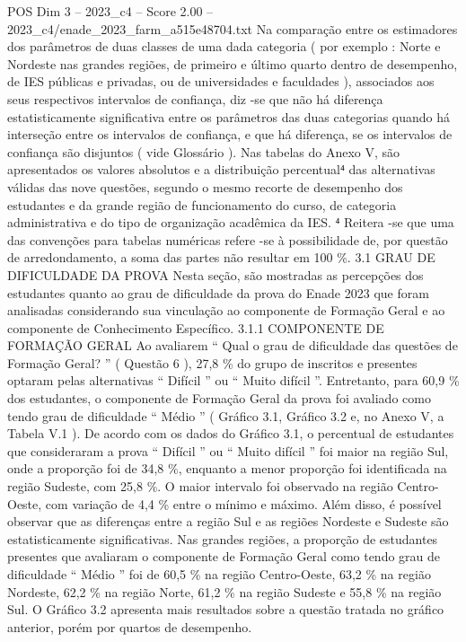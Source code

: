 \begin{textsample}{POS Dim 3 – 2023\_c4 – Score 2.00 – 2023\_c4/enade\_2023\_farm\_a515e48704.txt}
Na comparação entre os estimadores dos parâmetros de duas classes de uma dada categoria ( por exemplo : Norte e Nordeste nas grandes regiões, de primeiro e último quarto dentro de desempenho, de IES públicas e privadas, ou de universidades e faculdades ), associados aos seus respectivos intervalos de confiança, diz -se que não há diferença estatisticamente significativa entre os parâmetros das duas categorias quando há interseção entre os intervalos de confiança, e que há diferença, se os intervalos de confiança são disjuntos ( vide Glossário ).
Nas tabelas do Anexo V, são apresentados os valores absolutos e a distribuição percentual⁴ das alternativas válidas das nove questões, segundo o mesmo recorte de desempenho dos estudantes e da grande região de funcionamento do curso, de categoria administrativa e do tipo de organização acadêmica da IES. ⁴ Reitera -se que uma das convenções para tabelas numéricas refere -se à possibilidade de, por questão de arredondamento, a soma das partes não resultar em 100 \%. 3.1 GRAU DE DIFICULDADE DA PROVA Nesta seção, são mostradas as percepções dos estudantes quanto ao grau de dificuldade da prova do Enade 2023 que foram analisadas considerando sua vinculação ao componente de Formação Geral e ao componente de Conhecimento Específico. 3.1.1 COMPONENTE DE FORMAÇÃO GERAL Ao avaliarem “ Qual o grau de dificuldade das questões de Formação Geral? ” ( Questão 6 ), 27,8 \% do grupo de inscritos e presentes optaram pelas alternativas “ Difícil ” ou “ Muito difícil ”.
Entretanto, para 60,9 \% dos estudantes, o componente de Formação Geral da prova foi avaliado como tendo grau de dificuldade “ Médio ” ( Gráfico 3.1, Gráfico 3.2 e, no Anexo V, a Tabela V.1 ).
De acordo com os dados do Gráfico 3.1, o percentual de estudantes que consideraram a prova “ Difícil ” ou “ Muito difícil ” foi maior na região Sul, onde a proporção foi de 34,8 \%, enquanto a menor proporção foi identificada na região Sudeste, com 25,8 \%.
O maior intervalo foi observado na região Centro-Oeste, com variação de 4,4 \% entre o mínimo e máximo.
Além disso, é possível observar que as diferenças entre a região Sul e as regiões Nordeste e Sudeste são estatisticamente significativas.
Nas grandes regiões, a proporção de estudantes presentes que avaliaram o componente de Formação Geral como tendo grau de dificuldade “ Médio ” foi de 60,5 \% na região Centro-Oeste, 63,2 \% na região Nordeste, 62,2 \% na região Norte, 61,2 \% na região Sudeste e 55,8 \% na região Sul.
O Gráfico 3.2 apresenta mais resultados sobre a questão tratada no gráfico anterior, porém por quartos de desempenho.

\end{textsample}
